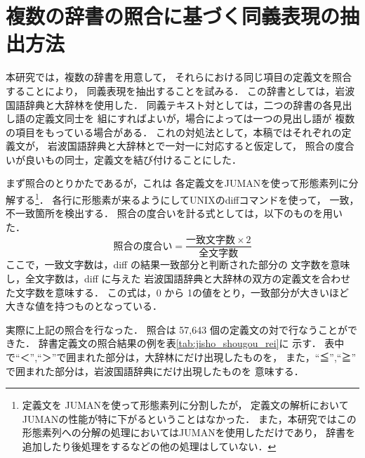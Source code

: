 \section{複数の辞書の照合に基づく同義表現の抽出方法}
\label{sec:method}

本研究では，複数の辞書を用意して，
それらにおける同じ項目の定義文を照合することにより，
同義表現を抽出することを試みる．
この辞書としては，岩波国語辞典と大辞林を使用した．
同義テキスト対としては，二つの辞書の各見出し語の定義文同士を
組にすればよいが，場合によっては一つの見出し語が
複数の項目をもっている場合がある．
これの対処法として，本稿ではそれぞれの定義文が，
岩波国語辞典と大辞林とで一対一に対応すると仮定して，
照合の度合いが良いもの同士，定義文を結び付けることにした．

まず照合のとりかたであるが，これは
各定義文をJUMAN\cite{JUMAN3.6}を使って形態素列に分解する\footnote{定義文を
JUMANを使って形態素列に分割したが，
定義文の解析においてJUMANの性能が特に下がるということはなかった．
また，本研究ではこの形態素列への分解の処理においてはJUMANを使用しただけであり，
辞書を追加したり後処理をするなどの他の処理はしていない．}．
各行に形態素が来るようにしてUNIXのdiffコマンドを使って，
一致，不一致箇所を検出する\cite{Murata_murata_diff_nlp2002}．
照合の度合いを計る式としては，以下のものを用いた．
\begin{equation}
  照合の度合い = \frac{一致文字数 \times 2}{全文字数}
\end{equation}
ここで，一致文字数は，diff の結果一致部分と判断された部分の
文字数を意味し，全文字数は，diff に与えた
岩波国語辞典と大辞林の双方の定義文を合わせた文字数を意味する．
この式は，0 から 1の値をとり，一致部分が大きいほど
大きな値を持つものとなっている．

実際に上記の照合を行なった．
照合は 57,643 個の定義文の対で行なうことができた．
辞書定義文の照合結果の例を表\ref{tab:jisho_shougou_rei}に
示す．
表中で``＜'',``＞''で囲まれた部分は，大辞林にだけ出現したものを，
また，``≦'',``≧'' で囲まれた部分は，岩波国語辞典にだけ出現したものを
意味する．

